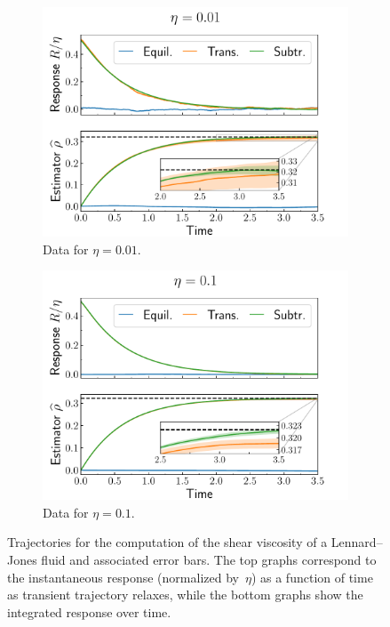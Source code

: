 \documentclass[11pt]{article}
\theoremstyle{definition}
\begin{document}
\begin{figure}[h!]
\centering
\begin{subfigure}{0.49\textwidth}
    \includegraphics[width=\textwidth]{LJ_shear_0.01.pdf}
    \caption{Data for $\eta = 0.01$.}
    \label{subfig:shear_0.01}
\end{subfigure}
\hfill
\begin{subfigure}{0.49\textwidth}
    \includegraphics[width=\textwidth]{LJ_shear_0.1.pdf}
    \caption{Data for $\eta = 0.1$.}
    \label{subfig:shear_0.1}
\end{subfigure}
\caption{Trajectories for the computation of the shear viscosity of a Lennard--Jones fluid and associated error bars. The top graphs correspond to the instantaneous response (normalized by~$\eta$) as a function of time as transient trajectory relaxes, while the bottom graphs show the integrated response over time.}
\label{fig:LJ_shear}
\end{figure}
\end{document}
